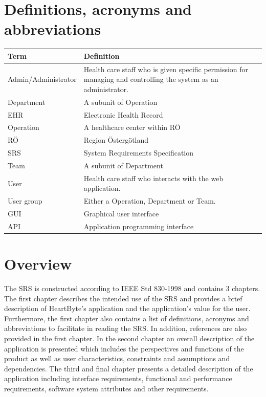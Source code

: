 \documentclass{scrreprt}
\begin{document}
\section{Definitions, acronyms and abbreviations}
\label{section:def}
\begin{center}
\begin{tabularx}{\linewidth}{| l | X |}
 \hline
 \textbf{Term} & \textbf{Definition} \\ 
 \hline
   Admin/Administrator & Health care staff who is given specific permission for managing and controlling the system as an administrator.  \\ 
  \hline
    Department & A subunit of Operation \\
  \hline
   EHR & Electronic Health Record \\ 
   \hline
      Operation & A healthcare center within RÖ \\ 
  \hline
    RÖ  & Region Östergötland  \\ 
  \hline
    SRS & System Requirements Specification \\
  \hline
    Team & A subunit of Department \\ 
  \hline
  User  & Health care staff who interacts with the web application.  \\
  \hline
  User group & Either a Operation, Department or Team. \\
  \hline 
  GUI & Graphical user interface \\
  \hline 
  API & Application programming interface \\
  \hline
\end{tabularx}
\end{center}


\renewcommand{\bibname}{References}


\section{Overview}
The SRS is constructed according to IEEE Std 830-1998 \cite{ieeesrsrec} and contains 3 chapters. The first chapter describes the intended use of the SRS and provides a brief description of HeartByte’s application and the application’s value for the user. Furthermore, the first chapter also contains a list of definitions, acronyms and abbreviations to facilitate in reading the SRS. In addition, references are also provided in the first chapter. In the second chapter an overall description of the application is presented which includes the perspectives and functions of the product as well as user characteristics, constraints and assumptions and dependencies. The third and final chapter presents a detailed description of the application including interface requirements, functional and performance requirements, software system attributes and other requirements. 
\end{document}
